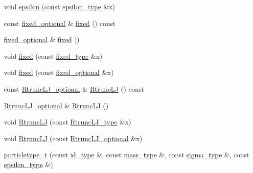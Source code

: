 \begin{DoxyCompactItemize}
\item 
void \hyperlink{classparticletype__t_abdba8823cb3cf31e884108daf55e8c68}{epsilon} (const \hyperlink{classparticletype__t_a94692265645066b820b0e4c308c1566f}{epsilon\+\_\+type} \&x)
\item 
const \hyperlink{classparticletype__t_a42eca3b383084472937b0ad4f370bbb2}{fixed\+\_\+optional} \& \hyperlink{classparticletype__t_a769f7e73caa39b4053eebae6a63b1bb0}{fixed} () const 
\item 
\hyperlink{classparticletype__t_a42eca3b383084472937b0ad4f370bbb2}{fixed\+\_\+optional} \& \hyperlink{classparticletype__t_a28426e8b4befda5b7a23aa4bb8e0eaee}{fixed} ()
\item 
void \hyperlink{classparticletype__t_a91eb27766f83482598408c6037d98ade}{fixed} (const \hyperlink{classparticletype__t_a689bb940332f300e99acdf3d50ffdc2c}{fixed\+\_\+type} \&x)
\item 
void \hyperlink{classparticletype__t_aa28d598502ab069d15b393a4c7cc2cf4}{fixed} (const \hyperlink{classparticletype__t_a42eca3b383084472937b0ad4f370bbb2}{fixed\+\_\+optional} \&x)
\item 
const \hyperlink{classparticletype__t_aa09967796541d58a44dfec6bcbb2c431}{Rtrunc\+L\+J\+\_\+optional} \& \hyperlink{classparticletype__t_a12397bd11e44dff87e3af98935cd177a}{Rtrunc\+LJ} () const 
\item 
\hyperlink{classparticletype__t_aa09967796541d58a44dfec6bcbb2c431}{Rtrunc\+L\+J\+\_\+optional} \& \hyperlink{classparticletype__t_a6189394520c9d7491e84c86a73c24969}{Rtrunc\+LJ} ()
\item 
void \hyperlink{classparticletype__t_a3a7d8c317728cbafed77153720c49f21}{Rtrunc\+LJ} (const \hyperlink{classparticletype__t_a3cd2c72b9a4607fb4e7022af7f979d61}{Rtrunc\+L\+J\+\_\+type} \&x)
\item 
void \hyperlink{classparticletype__t_a2e0c97e6c6c53b81c9ee52b598efe084}{Rtrunc\+LJ} (const \hyperlink{classparticletype__t_aa09967796541d58a44dfec6bcbb2c431}{Rtrunc\+L\+J\+\_\+optional} \&x)
\item 
\hyperlink{classparticletype__t_a9b7f4ea289cabc2ed87162ba7ac57236}{particletype\+\_\+t} (const \hyperlink{classparticletype__t_af4592f0136ed3224434007bc7f5c7fd4}{id\+\_\+type} \&, const \hyperlink{classparticletype__t_a7ebd18e57b545977bf3d1573ffa395f7}{mass\+\_\+type} \&, const \hyperlink{classparticletype__t_abbac1ed447872eb2db5cc90f2c1e1a6c}{sigma\+\_\+type} \&, const \hyperlink{classparticletype__t_a94692265645066b820b0e4c308c1566f}{epsilon\+\_\+type} \&)
\item 

\end{DoxyCompactItemize}
